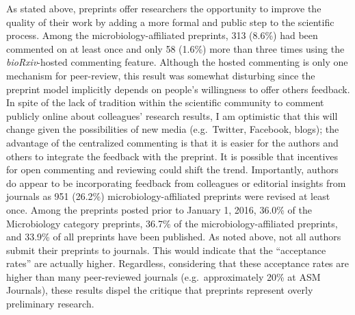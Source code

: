 \documentclass[11pt,]{article}
\begin{document}
As stated above, preprints offer researchers the opportunity to improve
the quality of their work by adding a more formal and public step to the
scientific process. Among the microbiology-affiliated preprints, 313
(8.6\%) had been commented on at least once and only 58 (1.6\%) more
than three times using the \emph{bioRxiv}-hosted commenting feature.
Although the hosted commenting is only one mechanism for peer-review,
this result was somewhat disturbing since the preprint model implicitly
depends on people's willingness to offer others feedback. In spite of
the lack of tradition within the scientific community to comment
publicly online about colleagues' research results, I am optimistic that
this will change given the possibilities of new media (e.g.~Twitter,
Facebook, blogs); the advantage of the centralized commenting is that it
is easier for the authors and others to integrate the feedback with the
preprint. It is possible that incentives for open commenting and
reviewing could shift the trend. Importantly, authors do appear to be
incorporating feedback from colleagues or editorial insights from
journals as 951 (26.2\%) microbiology-affiliated preprints were revised
at least once. Among the preprints posted prior to January 1, 2016,
36.0\% of the Microbiology category preprints, 36.7\% of the
microbiology-affiliated preprints, and 33.9\% of all preprints have been
published. As noted above, not all authors submit their preprints to
journals. This would indicate that the ``acceptance rates'' are actually
higher. Regardless, considering that these acceptance rates are higher
than many peer-reviewed journals (e.g.~approximately 20\% at ASM
Journals), these results dispel the critique that preprints represent
overly preliminary research.
\end{document}
